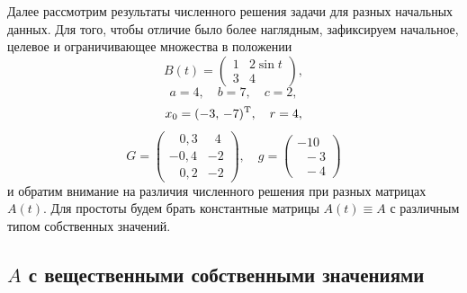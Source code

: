 Далее рассмотрим результаты численного решения задачи для разных начальных данных. Для того, чтобы отличие было более наглядным, зафиксируем начальное, целевое и ограничивающее множества в положении
$$
        B(t) =
        \begin{pmatrix}
                1 & 2\sin t\\
                3 & 4
        \end{pmatrix}, 
$$
$$
        a = 4,\quad b = 7,\quad c = 2,
$$
$$
        x_0 = (-3,\,-7)^{\mathrm{T}},\quad r = 4,
$$
$$
        G =
        \begin{pmatrix}
                \;\;\;0{,}3 & \;\;4\\
                -0{,}4 & -2 \\
                \;\;\;0{,}2 & -2
        \end{pmatrix},
        \quad g =
        \begin{pmatrix}
                -10 \\
                \;\;-3 \\
                \;\;-4
        \end{pmatrix}
$$
и обратим внимание на различия численного решения при разных матрицах $A(t)$. Для простоты будем брать константные матрицы $A(t) \equiv A$ с различным типом собственных значений.

\subsection{$A$ с вещественными собственными значениями}
